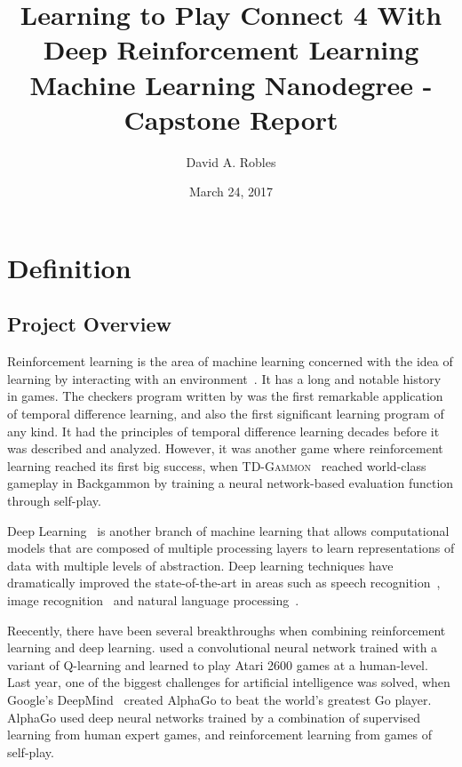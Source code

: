 \documentclass{article}
\title{Learning to Play Connect 4 With Deep Reinforcement Learning \\
       Machine Learning Nanodegree - Capstone Report}
\author{David A. Robles}
\date{March 24, 2017}
\begin{document}
\maketitle

\section{Definition}

\subsection{Project Overview}

Reinforcement learning is the area of machine learning concerned with the idea of learning by
interacting with an environment~\citep{Sutton1998RL}. It has a long and notable history in games.
The checkers program written by \citet{Samuel1959Checkers} was the first remarkable application of
temporal difference learning, and also the first significant learning program of any kind. It had
the principles of temporal difference learning decades before it was described and analyzed.
However, it was another game where reinforcement learning reached its first big success, when
\textsc{TD-Gammon}~\citep{Tesauro1995TD} reached world-class gameplay in Backgammon by training a
neural network-based evaluation function through self-play.

Deep Learning~\citep{LeCun2015Nature} is another branch of machine learning that allows
computational models that are composed of multiple processing layers to learn representations of
data with multiple levels of abstraction. Deep learning techniques have dramatically improved the
state-of-the-art in areas such as speech recognition~\citep{Hinton2012Speech}, image
recognition~\citep{Krizhevsky2012ImageNet} and natural language processing~\citep{Colbert2012}.

Reecently, there have been several breakthroughs when combining reinforcement learning and deep
learning. \cite{Mnih2015AtariNature} used a convolutional neural network trained with a variant of
Q-learning and learned to play Atari 2600 games at a human-level. Last year, one of the biggest
challenges for artificial intelligence was solved, when Google's DeepMind~\citep{Silver2016GoNature}
created AlphaGo to beat the world's greatest Go player. AlphaGo used deep neural networks trained by
a combination of supervised learning from human expert games, and reinforcement learning from games
of self-play.
\end{document}
